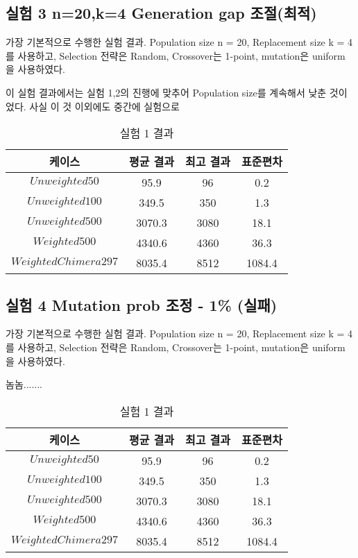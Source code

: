 \documentclass{article}
\begin{document}
\subsection{실험 3 n=20,k=4 Generation gap 조절(최적)}

가장 기본적으로 수행한 실험 결과. Population size n = 20, Replacement size k = 4를 사용하고, Selection 전략은 Random, Crossover는 1-point, mutation은 uniform 을 사용하였다.

이 실험 결과에서는 실험 1,2의 진행에 맞추어 Population size를 계속해서 낮춘 것이었다. 사실 이 것 이외에도 중간에 실험으로 


 \begin{table}[h]
 \begin{center}
\caption{실험 1 결과}
\begin{tabular}{cccc}
\hline\hline
케이스 & 평균 결과 & 최고 결과 & 표준편차\\
\hline\hline
$Unweighted 50$ & 95.9 & 96 & 0.2 \\
\hline
$Unweighted 100$ & 349.5 & 350 & 1.3\\
\hline
$Unweighted 500$ & 3070.3 & 3080 & 18.1\\
\hline
$Weighted 500$ & 4340.6 & 4360 & 36.3\\
\hline
$Weighted Chimera 297$ & 8035.4 & 8512 & 1084.4\\
\hline
\end{tabular}
\end{center}
\end{table}

\subsection{실험 4 Mutation prob 조정 - 1\% (실패)}

가장 기본적으로 수행한 실험 결과. Population size n = 20, Replacement size k = 4를 사용하고, Selection 전략은 Random, Crossover는 1-point, mutation은 uniform 을 사용하였다.

놈놈.......


 \begin{table}[h]
 \begin{center}
\caption{실험 1 결과}
\begin{tabular}{cccc}
\hline\hline
케이스 & 평균 결과 & 최고 결과 & 표준편차\\
\hline\hline
$Unweighted 50$ & 95.9 & 96 & 0.2 \\
\hline
$Unweighted 100$ & 349.5 & 350 & 1.3\\
\hline
$Unweighted 500$ & 3070.3 & 3080 & 18.1\\
\hline
$Weighted 500$ & 4340.6 & 4360 & 36.3\\
\hline
$Weighted Chimera 297$ & 8035.4 & 8512 & 1084.4\\
\hline
\end{tabular}
\end{center}
\end{table}
\end{document}

